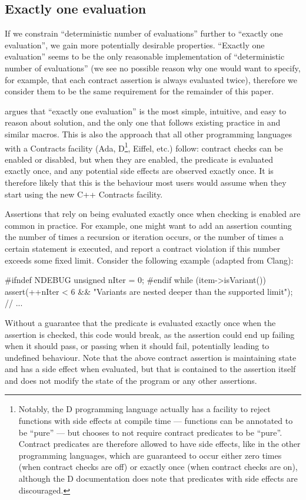 \subsection{Exactly one evaluation}
If we constrain ``deterministic number of evaluations'' further to ``exactly one evaluation'', we gain more potentially desirable properties. ``Exactly one evaluation'' seems to be the only reasonable implementation of ``deterministic number of evaluations'' (we see no possible reason why one would want to specify, for example, that each contract assertion is always evaluated twice), therefore we consider them to be the same requirement for the remainder of this paper.

\cite{P2756R0} argues that ``exactly one evaluation'' is the most simple, intuitive, and easy to reason about solution, and the only one that follows existing practice in  and similar macros. This is also the approach that all other programming languages with a Contracts facility (Ada, D\footnote{Notably, the D programming language actually has a facility to reject functions with side effects at compile time --- functions can be annotated to be ``pure'' --- but chooses to not require contract predicates to be ``pure''. Contract predicates are therefore allowed to have side effects, like in the other programming languages, which are guaranteed to occur either zero times (when contract checks are off) or exactly once (when contract checks are on), although the D documentation does note that predicates with side effects are discouraged.}, Eiffel, etc.) follow: contract checks can be enabled or disabled, but when they are enabled, the predicate is evaluated exactly once, and any potential side effects are observed exactly once. It is therefore likely that this is the behaviour most users would assume when they start using the new C++ Contracts facility.

Assertions that rely on being evaluated exactly once when checking is enabled are common in practice. For example, one might want to add an assertion counting the number of times a recursion or iteration occurs, or the number of times a certain statement is executed, and report a contract violation if this number exceeds some fixed limit. Consider the following example (adapted from Clang):
\begin{codeblock}
#ifndef NDEBUG
  unsigned nIter = 0;
#endif
  while (item->isVariant()) {
    assert(++nIter < 6 && "Variants are nested deeper than the supported limit");
    // ...
  }
\end{codeblock}
Without a guarantee that the predicate is evaluated exactly once when the assertion is checked, this code would break, as the assertion could end up failing when it should pass, or passing when it should fail, potentially leading to undefined behaviour. Note that the above contract assertion is maintaining state and has a side effect when evaluated, but that is contained to the assertion itself and does not modify the state of the program or any other assertions.

